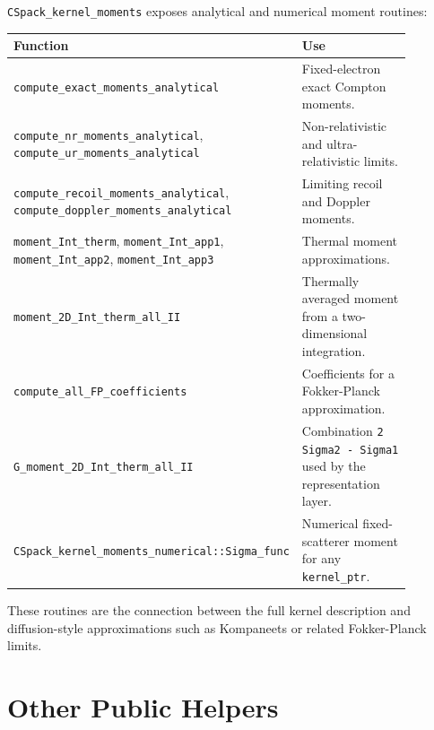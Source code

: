 \documentclass[11pt]{article}
\begin{document}
\texttt{CSpack\_kernel\_moments} exposes analytical and numerical moment
routines:
\begin{center}
\small
\begin{tabular}{L{0.42\linewidth}L{0.46\linewidth}}
\toprule
Function & Use \\
\midrule
\texttt{compute\_exact\_moments\_analytical} & Fixed-electron exact Compton moments. \\
\texttt{compute\_nr\_moments\_analytical}, \texttt{compute\_ur\_moments\_analytical} & Non-relativistic and ultra-relativistic limits. \\
\texttt{compute\_recoil\_moments\_analytical}, \texttt{compute\_doppler\_moments\_analytical} & Limiting recoil and Doppler moments. \\
\texttt{moment\_Int\_therm}, \texttt{moment\_Int\_app1}, \texttt{moment\_Int\_app2}, \texttt{moment\_Int\_app3} & Thermal moment approximations. \\
\texttt{moment\_2D\_Int\_therm\_all\_II} & Thermally averaged moment from a two-dimensional integration. \\
\texttt{compute\_all\_FP\_coefficients} & Coefficients for a Fokker-Planck approximation. \\
\texttt{G\_moment\_2D\_Int\_therm\_all\_II} & Combination \texttt{2 Sigma2 - Sigma1} used by the representation layer. \\
\texttt{CSpack\_kernel\_moments\_numerical::Sigma\_func} & Numerical fixed-scatterer moment for any \texttt{kernel\_ptr}. \\
\bottomrule
\end{tabular}
\end{center}

These routines are the connection between the full kernel description and
diffusion-style approximations such as Kompaneets or related Fokker-Planck
limits.

\section{Other Public Helpers}
\end{document}
